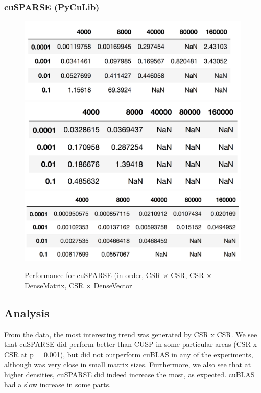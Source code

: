 \documentclass[12pt]{article}
\begin{document}
\subsubsection{cuSPARSE (PyCuLib)} 
\begin{figure}[h]
  \caption{Performance for cuSPARSE (in order, CSR $\times$ CSR, CSR $\times$ DenseMatrix, CSR $\times$ DenseVector}
  \includegraphics[scale = 0.20]{csr_x_csr_cusparse.png}
  \includegraphics[scale = 0.22]{csr_x_densematrix_cusparse.png}
  \includegraphics[scale = 0.22]{csr_x_densevector_cusparse.png}
\end{figure}
\newpage 

\subsection{Analysis}
From the data, the most interesting trend was generated by CSR x CSR. We see that cuSPARSE did perform better than CUSP in some particular areas (CSR x CSR at p = 0.001), but did not outperform cuBLAS in any of the experiments, although was very close in small matrix sizes. Furthermore, we also see that at higher densities, cuSPARSE did indeed increase the most, as expected. cuBLAS had a slow increase in some parts. 
\end{document}
